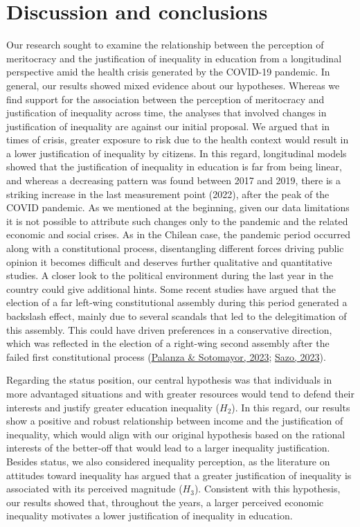 \documentclass[
  12pt,
  a4paper,
]{article}
\begin{document}
\hypertarget{discussion-and-conclusions}{%
\section{Discussion and conclusions}\label{discussion-and-conclusions}}

Our research sought to examine the relationship between the perception
of meritocracy and the justification of inequality in education from a
longitudinal perspective amid the health crisis generated by the
COVID-19 pandemic. In general, our results showed mixed evidence about
our hypotheses. Whereas we find support for the association between the
perception of meritocracy and justification of inequality across time,
the analyses that involved changes in justification of inequality are
against our initial proposal. We argued that in times of crisis, greater
exposure to risk due to the health context would result in a lower
justification of inequality by citizens. In this regard, longitudinal
models showed that the justification of inequality in education is far
from being linear, and whereas a decreasing pattern was found between
2017 and 2019, there is a striking increase in the last measurement
point (2022), after the peak of the COVID pandemic. As we mentioned at
the beginning, given our data limitations it is not possible to
attribute such changes only to the pandemic and the related economic and
social crises. As in the Chilean case, the pandemic period occurred
along with a constitutional process, disentangling different forces
driving public opinion it becomes difficult and deserves further
qualitative and quantitative studies. A closer look to the political
environment during the last year in the country could give additional
hints. Some recent studies have argued that the election of a far
left-wing constitutional assembly during this period generated a
backslash effect, mainly due to several scandals that led to the
delegitimation of this assembly. This could have driven preferences in a
conservative direction, which was reflected in the election of a
right-wing second assembly after the failed first constitutional process
(\protect\hyperlink{ref-palanza_chile_2023}{Palanza \& Sotomayor, 2023};
\protect\hyperlink{ref-sazo_chile_2023}{Sazo, 2023}).

Regarding the status position, our central hypothesis was that
individuals in more advantaged situations and with greater resources
would tend to defend their interests and justify greater education
inequality (\(H_2\)). In this regard, our results show a positive and
robust relationship between income and the justification of inequality,
which would align with our original hypothesis based on the rational
interests of the better-off that would lead to a larger inequality
justification. Besides status, we also considered inequality perception,
as the literature on attitudes toward inequality has argued that a
greater justification of inequality is associated with its perceived
magnitude (\(H_3\)). Consistent with this hypothesis, our results showed
that, throughout the years, a larger perceived economic inequality
motivates a lower justification of inequality in education.
\end{document}
